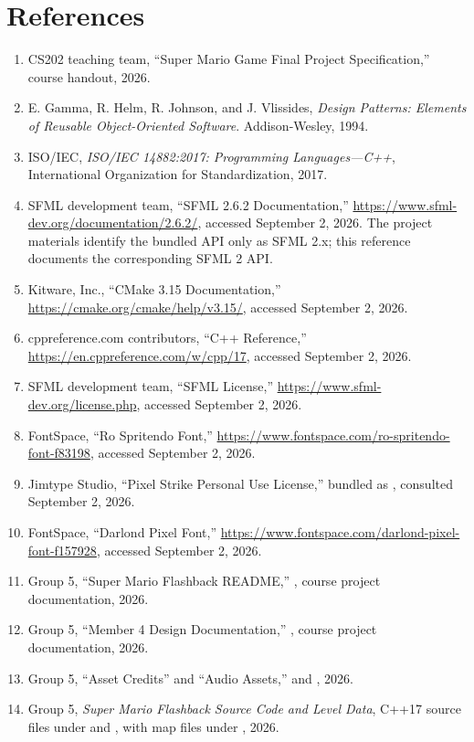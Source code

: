 \documentclass{template}
\begin{document}
\section{References}

\begingroup
\raggedright
\begin{enumerate}
    \item CS202 teaching team, ``Super Mario Game Final Project
          Specification,'' course handout, 2026.
    \item E. Gamma, R. Helm, R. Johnson, and J. Vlissides,
          \textit{Design Patterns: Elements of Reusable Object-Oriented
          Software}. Addison-Wesley, 1994.
    \item ISO/IEC, \textit{ISO/IEC 14882:2017: Programming Languages---C++},
          International Organization for Standardization, 2017.
    \item SFML development team, ``SFML 2.6.2 Documentation,''
          \url{https://www.sfml-dev.org/documentation/2.6.2/}, accessed
          September 2, 2026. The project materials identify the bundled API only
          as SFML 2.x; this reference documents the corresponding SFML 2 API.
    \item Kitware, Inc., ``CMake 3.15 Documentation,''
          \url{https://cmake.org/cmake/help/v3.15/}, accessed September 2, 2026.
    \item cppreference.com contributors, ``C++ Reference,''
          \url{https://en.cppreference.com/w/cpp/17}, accessed September 2,
          2026.
    \item SFML development team, ``SFML License,''
          \url{https://www.sfml-dev.org/license.php}, accessed September 2,
          2026.
    \item FontSpace, ``Ro Spritendo Font,''
          \url{https://www.fontspace.com/ro-spritendo-font-f83198}, accessed
          September 2, 2026.
    \item Jimtype Studio, ``Pixel Strike Personal Use License,'' bundled as
          ,
          consulted September 2, 2026.
    \item FontSpace, ``Darlond Pixel Font,''
          \url{https://www.fontspace.com/darlond-pixel-font-f157928}, accessed
          September 2, 2026.
    \item Group 5, ``Super Mario Flashback README,''
          , course project documentation, 2026.
    \item Group 5, ``Member 4 Design Documentation,''
          , course project documentation, 2026.
    \item Group 5, ``Asset Credits'' and ``Audio Assets,''
           and , 2026.
    \item Group 5, \textit{Super Mario Flashback Source Code and Level Data},
          C++17 source files under  and , with map
          files under , 2026.
\end{enumerate}
\endgroup
\end{document}
